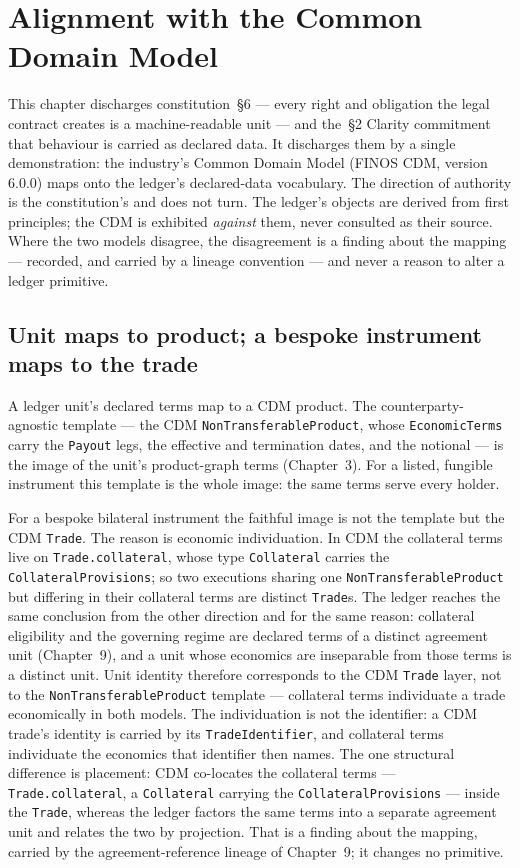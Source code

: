 \section{Alignment with the Common Domain Model}\label{ch:cdm}

This chapter discharges constitution~\S6 --- every right and obligation the
legal contract creates is a machine-readable unit --- and the~\S2 Clarity
commitment that behaviour is carried as declared data. It discharges them by a
single demonstration: the industry's Common Domain Model (FINOS CDM, version
6.0.0) maps onto the ledger's declared-data vocabulary. The direction of
authority is the constitution's and does not turn. The ledger's objects are
derived from first principles; the CDM is exhibited \emph{against} them, never
consulted as their source. Where the two models disagree, the disagreement is a
finding about the mapping --- recorded, and carried by a lineage convention ---
and never a reason to alter a ledger primitive.

\subsection{Unit maps to product; a bespoke instrument maps to the trade}

A ledger unit's declared terms map to a CDM product. The counterparty-agnostic
template --- the CDM \texttt{NonTransferableProduct}, whose \texttt{EconomicTerms}
carry the \texttt{Payout} legs, the effective and termination dates, and the
notional --- is the image of the unit's product-graph terms (Chapter~3). For a
listed, fungible instrument this template is the whole image: the same terms
serve every holder.

For a bespoke bilateral instrument the faithful image is not the template but
the CDM \texttt{Trade}. The reason is economic individuation. In CDM the
collateral terms live on \texttt{Trade.collateral}, whose type
\texttt{Collateral} carries the \texttt{CollateralProvisions}; so two executions
sharing one \texttt{NonTransferableProduct} but differing in their collateral
terms are distinct \texttt{Trade}s. The ledger reaches the same conclusion from
the other direction and for the same reason: collateral eligibility and the
governing regime are declared terms of a distinct agreement unit
(Chapter~9), and a unit whose economics are inseparable from those terms is a
distinct unit. Unit identity therefore corresponds to the CDM \texttt{Trade}
layer, not to the \texttt{NonTransferableProduct} template --- collateral terms
individuate a trade economically in both models. The individuation is not the
identifier: a CDM trade's identity is carried by its \texttt{TradeIdentifier},
and collateral terms individuate the economics that identifier then names. The
one structural difference is placement: CDM co-locates the collateral terms ---
\texttt{Trade.collateral}, a \texttt{Collateral} carrying the
\texttt{CollateralProvisions} --- inside the \texttt{Trade}, whereas the ledger
factors the same terms into a separate agreement unit and relates the two by
projection. That is a finding about the mapping, carried by the
agreement-reference lineage of Chapter~9; it changes no primitive.

